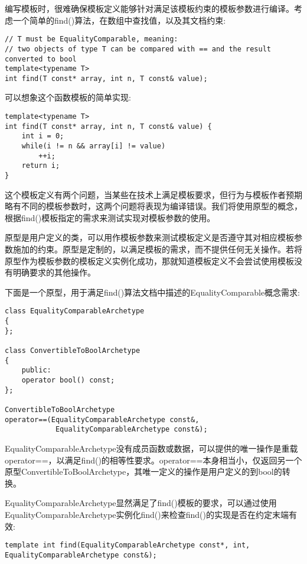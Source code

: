 编写模板时，很难确保模板定义能够针对满足该模板约束的模板参数进行编译。考虑一个简单的find()算法，在数组中查找值，以及其文档约束:

\begin{lstlisting}[style=styleCXX]
// T must be EqualityComparable, meaning:
// two objects of type T can be compared with == and the result converted to bool
template<typename T>
int find(T const* array, int n, T const& value);
\end{lstlisting}

可以想象这个函数模板的简单实现:

\begin{lstlisting}[style=styleCXX]
template<typename T>
int find(T const* array, int n, T const& value) {
	int i = 0;
	while(i != n && array[i] != value)
		++i;
	return i;
}
\end{lstlisting}

这个模板定义有两个问题，当某些在技术上满足模板要求，但行为与模板作者预期略有不同的模板参数时，这两个问题将表现为编译错误。我们将使用原型的概念，根据find()模板指定的需求来测试实现对模板参数的使用。

原型是用户定义的类，可以用作模板参数来测试模板定义是否遵守其对相应模板参数施加的约束。原型是定制的，以满足模板的需求，而不提供任何无关操作。若将原型作为模板参数的模板定义实例化成功，那就知道模板定义不会尝试使用模板没有明确要求的其他操作。

下面是一个原型，用于满足find()算法文档中描述的EqualityComparable概念需求:

\begin{lstlisting}[style=styleCXX]
class EqualityComparableArchetype
{
};

class ConvertibleToBoolArchetype
{
	public:
	operator bool() const;
};

ConvertibleToBoolArchetype
operator==(EqualityComparableArchetype const&,
			EqualityComparableArchetype const&);
\end{lstlisting}

EqualityComparableArchetype没有成员函数或数据，可以提供的唯一操作是重载operator==，以满足find()的相等性要求。operator==本身相当小，仅返回另一个原型ConvertibleToBoolArchetype，其唯一定义的操作是用户定义的到bool的转换。

EqualityComparableArchetype显然满足了find()模板的要求，可以通过使用EqualityComparableArchetype实例化find()来检查find()的实现是否在约定末端有效:

\begin{lstlisting}[style=styleCXX]
template int find(EqualityComparableArchetype const*, int,
EqualityComparableArchetype const&);
\end{lstlisting}

